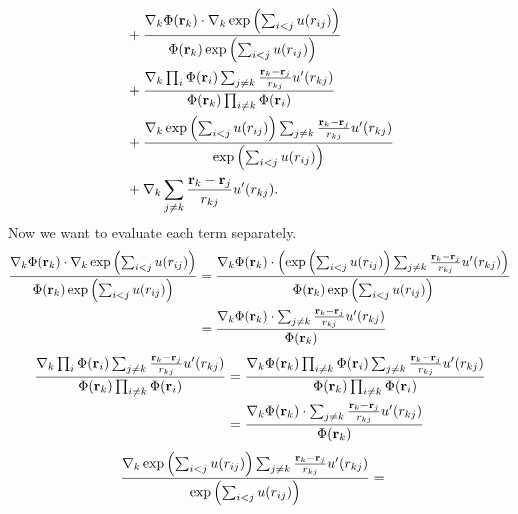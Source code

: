 \documentclass[a4paper,10pt]{article}
\begin{document}
\begin{appendices}
\begin{align}
                                                     &+ \frac{\nabla_k \Phi({\bf r}_k)\cdot \nabla_k \exp \left( \sum_{i<j}u(r_{ij})\right)}{\Phi({\bf r}_k)\exp \left( \sum_{i<j}u(r_{ij})\right)}                                               \nonumber \\
                                                     &+ \frac{ \nabla_k \prod_i \Phi({\bf r}_i)\sum_{j \neq k}\frac{{\bf r}_k - {\bf r}_j}{r_{kj}}u'(r_{kj})}{\Phi({\bf r}_k) \prod_{i \neq k} \Phi({\bf r}_i)}                                   \nonumber \\
                                                     &+ \frac{\nabla_k \exp \left( \sum_{i<j}u(r_{ij})\right)\sum_{j \neq k}\frac{{\bf r}_k - {\bf r}_j}{r_{kj}}u'(r_{kj})}{\exp \left( \sum_{i<j}u(r_{ij})\right)}                               \nonumber \\
                                                     &+ \nabla_k \sum_{j \neq k}\frac{{\bf r}_k - {\bf r}_j}{r_{kj}}u'(r_{kj}).   \label{first}
\end{align}
Now we want to evaluate each term separately.
\begin{align}
 \frac{\nabla_k \Phi({\bf r}_k)\cdot \nabla_k \exp \left( \sum_{i<j}u(r_{ij})\right)}{\Phi({\bf r}_k)\exp \left( \sum_{i<j}u(r_{ij})\right)} &= 
 \frac{\nabla_k \Phi({\bf r}_k) \cdot \left( \exp \left( \sum_{i<j}u(r_{ij})\right)\sum_{j \neq k}\frac{{\bf r}_k - {\bf r}_j}{r_{kj}}u'(r_{kj})\right)}{\Phi({\bf r}_k)\exp \left( \sum_{i<j}u(r_{ij})\right)} \nonumber \\
 &= \frac{\nabla_k \Phi({\bf r}_k) \cdot \sum_{j \neq k}\frac{{\bf r}_k - {\bf r}_j}{r_{kj}}u'(r_{kj})}{\Phi({\bf r}_k)} \label{second} 
\end{align}
\begin{align}
  \frac{ \nabla_k \prod_i \Phi({\bf r}_i)\sum_{j \neq k}\frac{{\bf r}_k - {\bf r}_j}{r_{kj}}u'(r_{kj})}{\Phi({\bf r}_k) \prod_{i \neq k} \Phi({\bf r}_i)} &=  
  \frac{\nabla_k \Phi({\bf r}_k) \prod_{i \neq k} \Phi({\bf r}_i) \sum_{j \neq k}\frac{{\bf r}_k - {\bf r}_j}{r_{kj}}u'(r_{kj})}{\Phi({\bf r}_k) \prod_{i \neq k} \Phi({\bf r}_i)}    \nonumber \\
 &= \frac{\nabla_k \Phi({\bf r}_k) \cdot \sum_{j \neq k}\frac{{\bf r}_k - {\bf r}_j}{r_{kj}}u'(r_{kj})}{\Phi({\bf r}_k)}        \label{third}
\end{align}
\begin{align}
 \frac{\nabla_k \exp \left( \sum_{i<j}u(r_{ij})\right)\sum_{j \neq k}\frac{{\bf r}_k - {\bf r}_j}{r_{kj}}u'(r_{kj})}{\exp \left( \sum_{i<j}u(r_{ij})\right)} &= 

\end{align}
\end{appendices}
\end{document}
